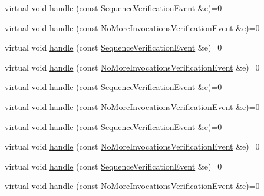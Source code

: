 \begin{DoxyCompactItemize}
\item 
virtual void \mbox{\hyperlink{structfakeit_1_1EventHandler_adf355a9888bc2bf78ce0e1219bfb1379}{handle}} (const \mbox{\hyperlink{structfakeit_1_1SequenceVerificationEvent}{Sequence\+Verification\+Event}} \&e)=0
\item 
virtual void \mbox{\hyperlink{structfakeit_1_1EventHandler_a826b9d15e23bad7013b219d8e45ef1d0}{handle}} (const \mbox{\hyperlink{structfakeit_1_1NoMoreInvocationsVerificationEvent}{No\+More\+Invocations\+Verification\+Event}} \&e)=0
\item 
virtual void \mbox{\hyperlink{structfakeit_1_1EventHandler_adf355a9888bc2bf78ce0e1219bfb1379}{handle}} (const \mbox{\hyperlink{structfakeit_1_1SequenceVerificationEvent}{Sequence\+Verification\+Event}} \&e)=0
\item 
virtual void \mbox{\hyperlink{structfakeit_1_1EventHandler_a826b9d15e23bad7013b219d8e45ef1d0}{handle}} (const \mbox{\hyperlink{structfakeit_1_1NoMoreInvocationsVerificationEvent}{No\+More\+Invocations\+Verification\+Event}} \&e)=0
\item 
virtual void \mbox{\hyperlink{structfakeit_1_1EventHandler_adf355a9888bc2bf78ce0e1219bfb1379}{handle}} (const \mbox{\hyperlink{structfakeit_1_1SequenceVerificationEvent}{Sequence\+Verification\+Event}} \&e)=0
\item 
virtual void \mbox{\hyperlink{structfakeit_1_1EventHandler_a826b9d15e23bad7013b219d8e45ef1d0}{handle}} (const \mbox{\hyperlink{structfakeit_1_1NoMoreInvocationsVerificationEvent}{No\+More\+Invocations\+Verification\+Event}} \&e)=0
\item 
virtual void \mbox{\hyperlink{structfakeit_1_1EventHandler_adf355a9888bc2bf78ce0e1219bfb1379}{handle}} (const \mbox{\hyperlink{structfakeit_1_1SequenceVerificationEvent}{Sequence\+Verification\+Event}} \&e)=0
\item 
virtual void \mbox{\hyperlink{structfakeit_1_1EventHandler_a826b9d15e23bad7013b219d8e45ef1d0}{handle}} (const \mbox{\hyperlink{structfakeit_1_1NoMoreInvocationsVerificationEvent}{No\+More\+Invocations\+Verification\+Event}} \&e)=0
\item 
virtual void \mbox{\hyperlink{structfakeit_1_1EventHandler_adf355a9888bc2bf78ce0e1219bfb1379}{handle}} (const \mbox{\hyperlink{structfakeit_1_1SequenceVerificationEvent}{Sequence\+Verification\+Event}} \&e)=0
\item 
virtual void \mbox{\hyperlink{structfakeit_1_1EventHandler_a826b9d15e23bad7013b219d8e45ef1d0}{handle}} (const \mbox{\hyperlink{structfakeit_1_1NoMoreInvocationsVerificationEvent}{No\+More\+Invocations\+Verification\+Event}} \&e)=0

\end{DoxyCompactItemize}
